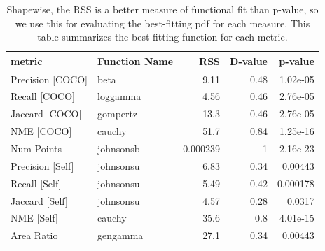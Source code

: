 \documentclass[12pt]{article}
\begin{document}
\begin{table}[ht]
\centering
\begin{tabular}{llrrr}
\hline
 metric           & Function Name   &       RSS &   D-value &   p-value \\
\hline
 Precision [COCO] & beta            &  9.11     &      0.48 &  1.02e-05 \\
 Recall [COCO]    & loggamma        &  4.56     &      0.46 &  2.76e-05 \\
 Jaccard [COCO]   & gompertz        & 13.3      &      0.46 &  2.76e-05 \\
 NME [COCO]       & cauchy          & 51.7      &      0.84 &  1.25e-16 \\
 Num Points       & johnsonsb       &  0.000239 &      1    &  2.16e-23 \\
 Precision [Self] & johnsonsu       &  6.83     &      0.34 &  0.00443  \\
 Recall [Self]    & johnsonsu       &  5.49     &      0.42 &  0.000178 \\
 Jaccard [Self]   & johnsonsu       &  4.57     &      0.28 &  0.0317   \\
 NME [Self]       & cauchy          & 35.6      &      0.8  &  4.01e-15 \\
 Area Ratio       & gengamma        & 27.1      &      0.34 &  0.00443  \\
\hline
\end{tabular}
\caption{Shapewise, the RSS is a better measure of functional fit than p-value, so we use this for evaluating the best-fitting pdf for each measure. This table summarizes the best-fitting function for each metric.}
\end{table}
\end{document}
